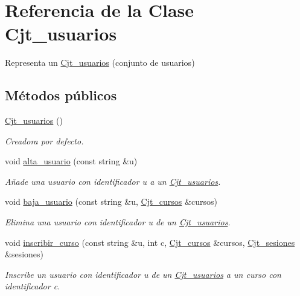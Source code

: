 \hypertarget{class_cjt__usuarios}{}\section{Referencia de la Clase Cjt\+\_\+usuarios}
\label{class_cjt__usuarios}


Representa un \mbox{\hyperlink{class_cjt__usuarios}{Cjt\+\_\+usuarios}} (conjunto de usuarios)  


\subsection*{Métodos públicos}
\begin{DoxyCompactItemize}
\item 
\mbox{\hyperlink{class_cjt__usuarios_ad51238f389a2c66291d9a1d7a81cb372}{Cjt\+\_\+usuarios}} ()
\begin{DoxyCompactList}\small\item\em Creadora por defecto. \end{DoxyCompactList}\item 
void \mbox{\hyperlink{class_cjt__usuarios_af2bc90f54125530ce07dde609dfbe43b}{alta\+\_\+usuario}} (const string \&u)
\begin{DoxyCompactList}\small\item\em Añade una usuario con identificador u a un \mbox{\hyperlink{class_cjt__usuarios}{Cjt\+\_\+usuarios}}. \end{DoxyCompactList}\item 
void \mbox{\hyperlink{class_cjt__usuarios_a318dcc3682784e73e0fe98ddbf39350c}{baja\+\_\+usuario}} (const string \&u, \mbox{\hyperlink{class_cjt__cursos}{Cjt\+\_\+cursos}} \&cursos)
\begin{DoxyCompactList}\small\item\em Elimina una usuario con identificador u de un \mbox{\hyperlink{class_cjt__usuarios}{Cjt\+\_\+usuarios}}. \end{DoxyCompactList}\item 
void \mbox{\hyperlink{class_cjt__usuarios_a94946c0533b04337bee7395f1dac0366}{inscribir\+\_\+curso}} (const string \&u, int c, \mbox{\hyperlink{class_cjt__cursos}{Cjt\+\_\+cursos}} \&cursos, \mbox{\hyperlink{class_cjt__sesiones}{Cjt\+\_\+sesiones}} \&sesiones)
\begin{DoxyCompactList}\small\item\em Inscribe un usuario con identificador u de un \mbox{\hyperlink{class_cjt__usuarios}{Cjt\+\_\+usuarios}} a un curso con identificador c. \end{DoxyCompactList}\item 

\end{DoxyCompactItemize}
